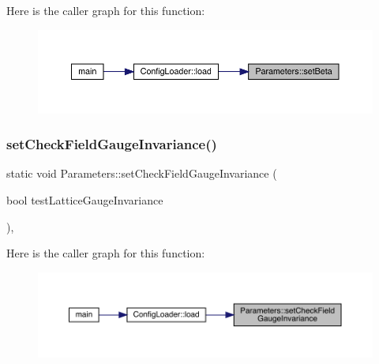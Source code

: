 Here is the caller graph for this function\+:\nopagebreak
\begin{figure}[H]
\begin{center}
\leavevmode
\includegraphics[width=350pt]{class_parameters_a8462149cb29ecf936f1f9945f5de4908_icgraph}
\end{center}
\end{figure}
\mbox{\label{class_parameters_ad6a40d1cf972c0f1379cf011bb7da2b1}} 
\subsubsection{\texorpdfstring{setCheckFieldGaugeInvariance()}{setCheckFieldGaugeInvariance()}}
{\footnotesize\ttfamily static void Parameters\+::set\+Check\+Field\+Gauge\+Invariance (\begin{DoxyParamCaption}\item[{bool}]{test\+Lattice\+Gauge\+Invariance }\end{DoxyParamCaption})\hspace{0.3cm}{\ttfamily [inline]}, {\ttfamily [static]}}

Here is the caller graph for this function\+:\nopagebreak
\begin{figure}[H]
\begin{center}
\leavevmode
\includegraphics[width=350pt]{class_parameters_ad6a40d1cf972c0f1379cf011bb7da2b1_icgraph}
\end{center}
\end{figure}
\mbox{\label{class_parameters_a4863c437df48cd3242fdb67221a3d6ed}} 
